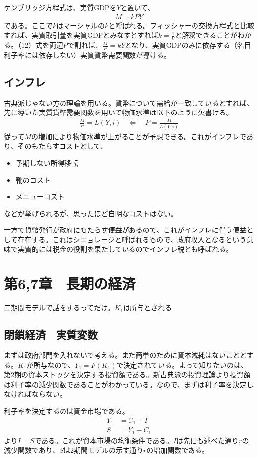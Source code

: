 \documentclass{jsarticle}
\begin{document}
ケンブリッジ方程式は、実質GDPを$Y$と置いて、
\begin{align}
	M = kPY
\end{align}
である。ここで$k$はマーシャルの$k$と呼ばれる。フィッシャーの交換方程式と比較すれば、実質取引量を実質GDPとみなすとすれば$k = \frac{1}{V}$と解釈できることがわかる。（12）式を両辺$P$で割れば、$\frac{M}{P} = kY$となり、実質GDPのみに依存する（名目利子率には依存しない）実質貨幣需要関数が導ける。

\subsection{インフレ}
古典派じゃない方の理論を用いる。貨幣について需給が一致しているとすれば、先に導いた実質貨幣需要関数を用いて物価水準は以下のように欠書ける。
\begin{align*}
	\frac{M}{P} = L(Y, i)\quad \Leftrightarrow\quad P = \frac{M}{L(Y, i)}
\end{align*}
従って$M$の増加により物価水準が上がることが予想できる。これがインフレであり、そのもたらすコストとして、
\begin{itemize}
\item 予期しない所得移転
\item 靴のコスト
\item メニューコスト
\end{itemize}
などが挙げられるが、思ったほど自明なコストはない。

一方で貨幣発行が政府にもたらす便益があるので、これがインフレに伴う便益として存在する。これはシニョレージと呼ばれるもので、政府収入となるという意味で実質的には税金の役割を果たしているのでインフレ税とも呼ばれる。

\section{第6,7章　長期の経済}
二期間モデルで話をするってだけ。$K_1$は所与とされる
\subsection{閉鎖経済　実質変数}
まずは政府部門を入れないで考える。また簡単のために資本減耗はないこととする。$K_1$が所与なので、$Y_1 = F(K_1)$で決定されている。よって知りたいのは、第2期の資本ストックを決定する投資額である。新古典派の投資理論より投資額は利子率の減少関数であることがわかっている。なので、まずは利子率を決定しなければならない。

利子率を決定するのは資金市場である。
\begin{align}
	Y_1 &= C_1 + I\\
	S &= Y_1 - C_1
\end{align}
より$I=S$である。これが資本市場の均衡条件である。$I$は先にも述べた通り$r$の減少関数であり、$S$は2期間モデルの示す通り$r$の増加関数である。
\end{document}
